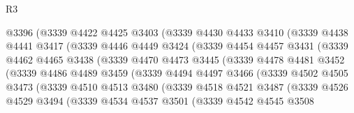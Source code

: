 \begin{lexlean}{R3}
\begin{coremodule}
                  @3396
                  (@3339
                    @4422
                    @4425
                    @3403
                    (@3339
                      @4430
                      @4433
                      @3410
                      (@3339
                        @4438
                        @4441
                        @3417
                        (@3339
                          @4446
                          @4449
                          @3424
                          (@3339
                            @4454
                            @4457
                            @3431
                            (@3339
                              @4462
                              @4465
                              @3438
                              (@3339
                                @4470
                                @4473
                                @3445
                                (@3339
                                  @4478
                                  @4481
                                  @3452
                                  (@3339
                                    @4486
                                    @4489
                                    @3459
                                    (@3339
                                      @4494
                                      @4497
                                      @3466
                                      (@3339
                                        @4502
                                        @4505
                                        @3473
                                        (@3339
                                          @4510
                                          @4513
                                          @3480
                                          (@3339
                                            @4518
                                            @4521
                                            @3487
                                            (@3339
                                              @4526
                                              @4529
                                              @3494
                                              (@3339
                                                @4534
                                                @4537
                                                @3501
                                                (@3339
                                                  @4542
                                                  @4545
                                                  @3508

\end{coremodule}
\end{lexlean}
